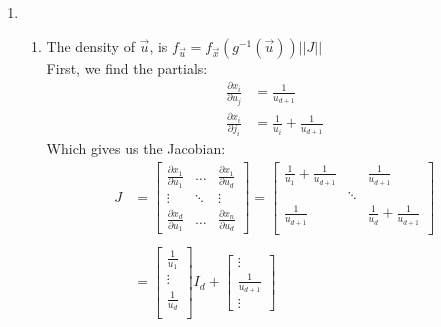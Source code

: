 \documentclass[paper=a4, fontsize=11pt]{scrartcl}
\begin{document}
\begin{enumerate}[1.]
  \item
    \begin{enumerate}[1.]
      \item
        The density of $\vec{u}$, is $f_{\vec{u}} = f_{\vec{x}}(g^{-1}(\vec{u}))||J||$ \\

        First, we find the partials:
        \begin{align*}
          \frac{\partial x_i}{\partial u_j} &= \frac{1}{u_{d+1}} \\
          \frac{\partial x_i}{\partial j_i} &= \frac{1}{u_i} + \frac{1}{u_{d+1}}
        \end{align*}
        Which gives us the Jacobian:
        \begin{align*}
          J &=
              \begin{bmatrix}
                \frac{\partial x_1}{\partial u_1} & \ldots & \frac{\partial x_1}{\partial u_d} \\
                \vdots & \ddots & \vdots \\
                \frac{\partial x_d}{\partial u_1} & \ldots & \frac{\partial x_n}{\partial u_d}
              \end{bmatrix} =
              \begin{bmatrix}
                \frac{1}{u_1} + \frac{1}{u_{d+1}} & & \frac{1}{u_{d+1}} \\
                & \ddots & \\
                \frac{1}{u_{d+1}} & & \frac{1}{u_d} + \frac{1}{u_{d+1}} \\
              \end{bmatrix} \\ \\
            &=
              \begin{bmatrix}
                \frac{1}{u_1} \\
                \vdots \\
                \frac{1}{u_d} \\
              \end{bmatrix}I_d +
              \begin{bmatrix}
                \vdots \\
                \frac{1}{u_{d+1}} \\
                \vdots

\end{bmatrix}
\end{align*}
\end{enumerate}
\end{enumerate}
\end{document}
